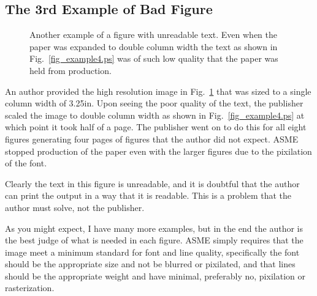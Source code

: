 \documentclass[12pt]{asme2ej}
\begin{document}

    \subsection{The 3rd Example of Bad Figure}
    \begin{figure}
        \centerline{}
        \caption{Another example of a figure with unreadable text. Even when the paper was expanded to double column width the text as shown in Fig.~\ref{fig_example4.ps} was of such low quality that the paper was held from production.}
        \label{fig_example3.ps}
    \end{figure}

    \begin{figure*}
        \centerline{}
        \caption{A figure expanded to double column width the text from Figure~\ref{fig_example3.ps}}
        \label{fig_example4.ps}
    \end{figure*}
    An author provided the high resolution image
    in Fig.~\ref{fig_example3.ps}
    that was sized to a single column width of 3.25in. Upon seeing the poor quality of the text, the publisher scaled the image to double column width as shown in Fig.~\ref{fig_example4.ps}
    at which point it took half of a page. The publisher went on to do this for all eight figures generating four pages of figures that the author did not expect. ASME stopped production of the paper even with the larger figures due to the pixilation of the font.

    Clearly the text in this figure is unreadable, and it is doubtful that the author can print the output in a way that it is readable. This is a problem that the author must solve, not the publisher.

    As you might expect, I have many more examples, but in the end the author is the best judge of what is needed in each figure. ASME simply requires that the image meet a minimum standard for font and line quality, specifically the font should be the appropriate size and not be blurred or pixilated, and that lines should be the appropriate weight and have minimal, preferably no, pixilation or rasterization.
\end{document}

